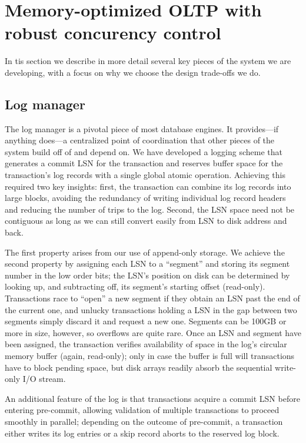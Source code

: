 
\section{Memory-optimized OLTP with robust concurency control}

In tis section we describe in more detail several key pieces of the system we are developing, with a focus on why we choose the design trade-offs we do.

\subsection{Log manager}

The log manager is a pivotal piece of most database engines. It provides---if anything does---a centralized point of coordination that other pieces of the system build off of and depend on. We have developed a logging scheme that  generates a commit LSN for the transaction and reserves buffer space for the transaction's log records with a single global atomic operation. Achieving this required two key insights: first, the transaction can combine its log records into large blocks, avoiding the redundancy of writing individual log record headers and reducing the number of trips to the log. Second, the LSN space need not be contiguous as long as we can still convert easily from LSN to disk address and back.

The first property arises from our use of append-only storage. We achieve the second property by assigning each LSN to a ``segment'' and storing its segment number in the low order bits; the LSN's position on disk can be determined by looking up, and subtracting off, its segment's starting offset (read-only). Transactions race to ``open'' a new segment if they obtain an LSN past the end of the current one, and unlucky transactions holding a LSN in the gap between two segments simply discard it and request a new one. Segments can be 100GB or more in size, however, so overflows are quite rare. Once an LSN and segment have been assigned, the transaction verifies availability of space in the log's circular memory buffer (again, read-only); only in case the buffer is full will transactions have to block pending space, but disk arrays readily absorb the sequential write-only I/O stream.

An additional feature of the log is that transactions acquire a commit LSN before entering pre-commit, allowing validation of multiple transactions to proceed smoothly in parallel; depending on the outcome of pre-commit, a transaction either writes its log entries or a skip record aborts to the reserved log block.

